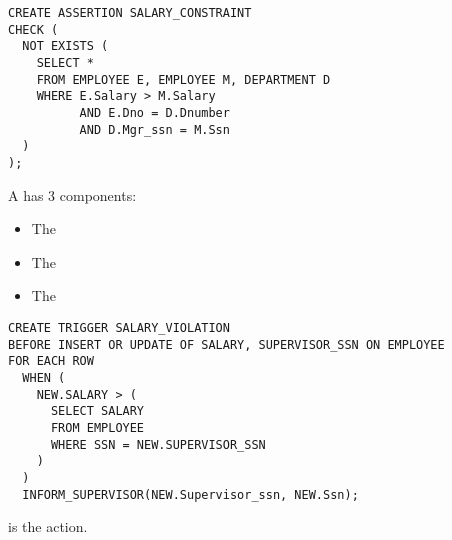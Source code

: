     \begin{verbatim}
CREATE ASSERTION SALARY_CONSTRAINT
CHECK (
  NOT EXISTS (
    SELECT *
    FROM EMPLOYEE E, EMPLOYEE M, DEPARTMENT D
    WHERE E.Salary > M.Salary
          AND E.Dno = D.Dnumber
          AND D.Mgr_ssn = M.Ssn
  )
);
    \end{verbatim}

    \par A  has 3 components:
    \begin{itemize}
      \item The 
      \item The 
      \item The 
    \end{itemize}
    \begin{verbatim}
CREATE TRIGGER SALARY_VIOLATION
BEFORE INSERT OR UPDATE OF SALARY, SUPERVISOR_SSN ON EMPLOYEE
FOR EACH ROW
  WHEN (
    NEW.SALARY > (
      SELECT SALARY
      FROM EMPLOYEE
      WHERE SSN = NEW.SUPERVISOR_SSN
    )
  )
  INFORM_SUPERVISOR(NEW.Supervisor_ssn, NEW.Ssn);
    \end{verbatim}
    \par {} is the action.